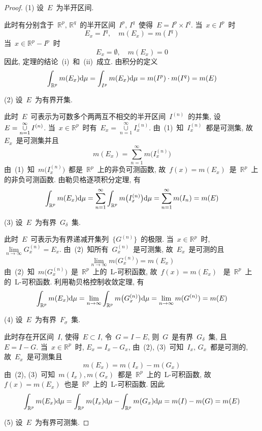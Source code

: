 \begin{proof}
(1) 设~$E$~为半开区间.

此时有分别含于~$\mathbb{R}^p,\, \mathbb{R}^q$~的半开区间~$I^p,\, I^q$~使得~$E=I^p \times I^q$. 当~$x \in I^p$~时
\[
E_x=I^q, \quad m(E_x)=m(I^q)
\]
当~$x \in \mathbb{R}^p- I^p$~时
\[
E_x=\emptyset, \quad m(E_x)=0
\]
因此, 定理的结论~(i)~和~(ii)~成立. 由积分的定义
\[
\int_{\mathbb{R}^{p}}m(E_x) \mathrm{d} \mu=\int_{I^{p}}m(E_{x}) \mathrm{d} \mu = m(I^p) \cdot m(I^q)=m(E)
\]

(2) 设~$E$~为有界开集.

此时~$E$~可表示为可数多个两两互不相交的半开区间~$I^{(n)}$~的并集,
设~$E=\mathop{\mathop{\cup}}\limits_{n=1}^{\infty}I^{(n)}$.
当~$x\in \mathbb{R}^p$~时有~$E_{x}=\mathop{\cup}\limits_{n=1}^{\infty}I^{(n)}_x$. 由~(1)~知~$I^{(n)}_x$~都是可测集, 故~$E_{x}$~是可测集并且
\[
m(E_x)=\mathop{\sum}_{n=1}^{\infty}m\big(I^{(n)}_x\big)
\]
由~(1)~知~$m\big(I^{(n)}_x\big)$~都是~$\mathbb{R}^{p}$~上的非负可测函数,
故~$f(x)=m(E_x)$~是~$\mathbb{R}^p$~上的非负可测函数. 由勒贝格逐项积分定理, 有
\[
\int_{\mathbb{R}^p}m(E_x) \mathrm{d} \mu = \sum_{n=1}^{\infty}\int_{\mathbb{R}^{p}}m\big(I^{(n)}_x\big) \mathrm{d} \mu =\sum_{n=1}^{\infty}m(I_{n})=m(E)
\]

(3) 设~$E$~为有界~$G_{\delta}$~集.

此时~$E$~可表示为有界递减开集列~$\{G^{(n)}\}$~的极限. 当~$x \in \mathbb{R}^p$~时, $\lim\limits_{n\rightarrow\infty} G^{(n)}_x = E_x$.
由~(2)~知所有~$G^{(n)}_x$~是可测集, 故~$E_{x}$~是可测的且
\[
\lim\limits_{n\rightarrow\infty} m\big(G^{(n)}_x\big) = m(E_x)
\]
由~(2)~知~$m\big(G^{(n)}_x\big)$~是~$\mathbb{R}^{p}$~上的~L-可积函数, 故~$f(x)=m(E_x)$~
是~$\mathbb{R}^{p}$~上的~L-可积函数. 利用勒贝格控制收敛定理, 有
\[
\int_{\mathbb{R}^{p}} m(E_x)\mathrm{d} \mu = \lim\limits_{n \to \infty}\int_{\mathbb{R}^{p}} m\big(G^{(n)}_x\big) \mathrm{d} \mu = \lim\limits_{n \to \infty} m(G^{(n)})=m(E)
\]

(4) 设~$E$~为有界~$F_{\sigma}$~集.

此时存在开区间~$I$, 使得~$E \subset I$, 令~$G = I- E$, 则~$G$~是有界~$G_{\delta}$~集, 且~$E = I- G$. 当~$x \in \mathbb{R}^{p}$~时,
$E_x=I_x - G_x$, 由~(2), (3)~可知~$I_{x},\, G_{x}$~都是可测的, 故~$E_{x}$~是可测集且
\[
m(E_{x})=m(I_{x})-m(G_{x})
\]
由~(2), (3)~可知~$m(I_{x}),  m(G_{x})$~都是~$\mathbb{R}^{p}$~上的~L-可积函数, 故~$f(x)=m(E_{x})$~也是~$\mathbb{R}^p$~上的~L-可积函数. 因此
\[
\int_{\mathbb{R}^{p}}m(E_{x}) \mathrm{d} \mu =\int_{\mathbb{R}^{p}}m(I_{x}) \mathrm{d} \mu -\int_{\mathbb{R}^{p}}m(G_{x}) \mathrm{d} \mu = m(I)-m(G)=m(E)
\]

(5) 设~$E$~为有界可测集.


\end{proof}

